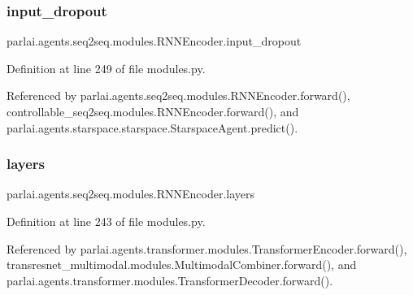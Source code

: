 \mbox{\label{classparlai_1_1agents_1_1seq2seq_1_1modules_1_1RNNEncoder_a63109b3ee3136b7044f70b7d80e7ca42}} 
\subsubsection{\texorpdfstring{input\+\_\+dropout}{input\_dropout}}
{\footnotesize\ttfamily parlai.\+agents.\+seq2seq.\+modules.\+R\+N\+N\+Encoder.\+input\+\_\+dropout}



Definition at line 249 of file modules.\+py.



Referenced by parlai.\+agents.\+seq2seq.\+modules.\+R\+N\+N\+Encoder.\+forward(), controllable\+\_\+seq2seq.\+modules.\+R\+N\+N\+Encoder.\+forward(), and parlai.\+agents.\+starspace.\+starspace.\+Starspace\+Agent.\+predict().

\mbox{\label{classparlai_1_1agents_1_1seq2seq_1_1modules_1_1RNNEncoder_afa4c686f37241bdaee7bd5a290aaed54}} 
\subsubsection{\texorpdfstring{layers}{layers}}
{\footnotesize\ttfamily parlai.\+agents.\+seq2seq.\+modules.\+R\+N\+N\+Encoder.\+layers}



Definition at line 243 of file modules.\+py.



Referenced by parlai.\+agents.\+transformer.\+modules.\+Transformer\+Encoder.\+forward(), transresnet\+\_\+multimodal.\+modules.\+Multimodal\+Combiner.\+forward(), and parlai.\+agents.\+transformer.\+modules.\+Transformer\+Decoder.\+forward().

